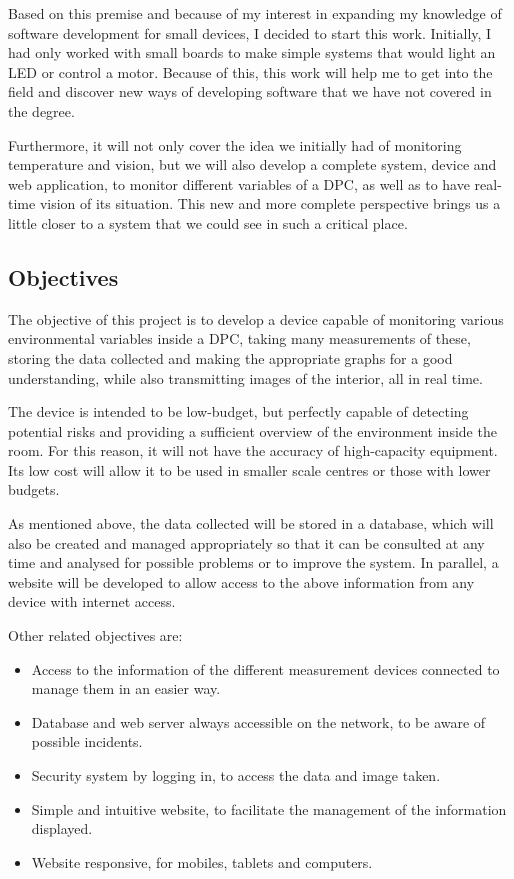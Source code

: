 Based on this premise and because of my interest in expanding my knowledge of software development for small devices, I decided to start this work. Initially, I had only worked with small boards to make simple systems that would light an LED or control a motor. Because of this, this work will help me to get into the field and discover new ways of developing software that we have not covered in the degree.
\pagebreak

Furthermore, it will not only cover the idea we initially had of monitoring temperature and vision, but we will also develop a complete system, device and web application, to monitor different variables of a DPC, as well as to have real-time vision of its situation. This new and more complete perspective brings us a little closer to a system that we could see in such a critical place.

\subsection{Objectives}\label{subsec:objectives}
The objective of this project is to develop a device capable of monitoring various environmental variables inside a DPC, taking many measurements of these, storing the data collected and making the appropriate graphs for a good understanding, while also transmitting images of the interior, all in real time.

The device is intended to be low-budget, but perfectly capable of detecting potential risks and providing a sufficient overview of the environment inside the room. For this reason, it will not have the accuracy of high-capacity equipment. Its low cost will allow it to be used in smaller scale centres or those with lower budgets.

As mentioned above, the data collected will be stored in a database, which will also be created and managed appropriately so that it can be consulted at any time and analysed for possible problems or to improve the system. In parallel, a website will be developed to allow access to the above information from any device with internet access.

Other related objectives are:
\begin{itemize}
	\item Access to the information of the different measurement devices connected to manage them in an easier way.
	\item Database and web server always accessible on the network, to be aware of possible incidents.
	\item Security system by logging in, to access the data and image taken.
	\item Simple and intuitive website, to facilitate the management of the information displayed.
	\item Website responsive, for mobiles, tablets and computers.
\end{itemize}


